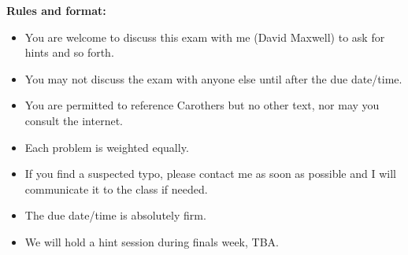 \documentclass[minion]{homework}
\begin{document}
{\bf  Rules and format:}
\begin{itemize}

\item You are welcome to discuss this exam with me (David Maxwell) to ask for hints and so forth.
\item You may not discuss the exam with anyone else until after the due date/time.
\item You are permitted to reference Carothers but no other text, nor
may you consult the internet.
\item Each problem is weighted equally.
\item  If you find a suspected typo, please contact me as soon as possible and I will
communicate it to the class if needed.
\item The due date/time is absolutely firm.
\item We will hold a hint session during finals week, TBA.
\end{itemize}
\end{document}
